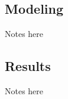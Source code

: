 \subsection{Modeling}
\label{subsec:model}

Notes here

\subsection{Results}
\label{subsec:results}

Notes here


